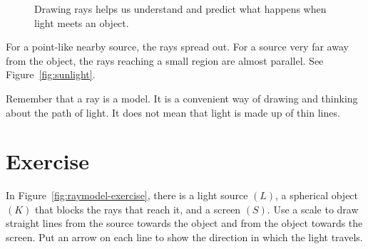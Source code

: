 \documentclass{xtufte-handout}
\begin{document}
\begin{figure}[h!]
  \caption{\label{fig:raymodel}Drawing rays helps us understand and predict what happens when light meets an object.}
\end{figure}

For a point-like nearby source, the rays spread out. For a source very far away from the object, the rays reaching a small region are almost parallel. See Figure~\ref{fig:sunlight}.

\begin{marginfigure}
  \caption{\label{fig:sunlight}The Sun is very far from Earth, so we can usually represent sunlight reaching Earth as a set of nearly parallel rays.}
\end{marginfigure}

Remember that a ray is a model. It is a convenient way of drawing and thinking about the path of light. It does not mean that light is made up of thin lines.

\section{Exercise}
In Figure~\ref{fig:raymodel-exercise}, there is a light source $(L)$, a spherical object $(K)$ that blocks the rays that reach it, and a screen $(S)$. Use a scale to draw straight lines from the source towards the object and from the object towards the screen. Put an arrow on each line to show the direction in which the light travels. 
\end{document}
